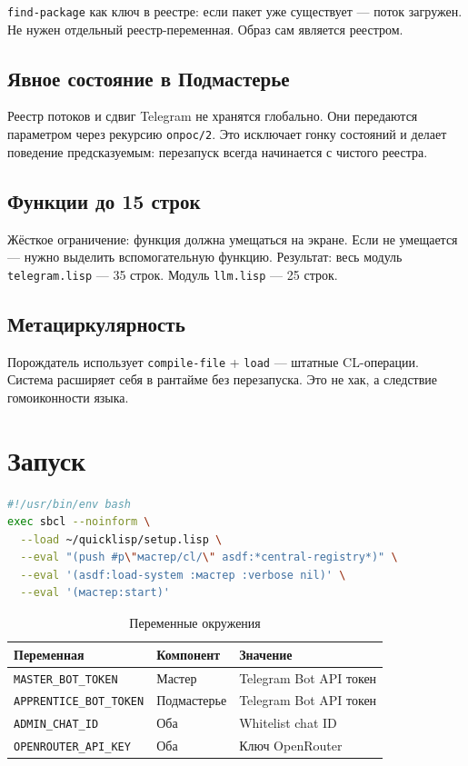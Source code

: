 \documentclass[11pt,a4paper]{article}
\begin{document}
\texttt{find-package} как ключ в реестре: если пакет уже существует — поток загружен. Не нужен отдельный реестр-переменная. Образ сам является реестром.

\subsection{Явное состояние в Подмастерье}

Реестр потоков и сдвиг Telegram не хранятся глобально. Они передаются параметром через рекурсию \texttt{опрос/2}. Это исключает гонку состояний и делает поведение предсказуемым: перезапуск всегда начинается с чистого реестра.

\subsection{Функции до 15 строк}

Жёсткое ограничение: функция должна умещаться на экране. Если не умещается — нужно выделить вспомогательную функцию. Результат: весь модуль \texttt{telegram.lisp} — 35 строк. Модуль \texttt{llm.lisp} — 25 строк.

\subsection{Метациркулярность}

Порождатель использует \texttt{compile-file} + \texttt{load} — штатные CL-операции. Система расширяет себя в рантайме без перезапуска. Это не хак, а следствие гомоиконности языка.

\section{Запуск}

\begin{lstlisting}[language=bash,caption={start.sh}]
#!/usr/bin/env bash
exec sbcl --noinform \
  --load ~/quicklisp/setup.lisp \
  --eval "(push #p\"мастер/cl/\" asdf:*central-registry*)" \
  --eval '(asdf:load-system :мастер :verbose nil)' \
  --eval '(мастер:start)'
\end{lstlisting}

\begin{table}[H]\centering\small
\begin{tabular}{lll}
\toprule
\textbf{Переменная} & \textbf{Компонент} & \textbf{Значение} \\
\midrule
\texttt{MASTER\_BOT\_TOKEN}     & Мастер      & Telegram Bot API токен \\
\texttt{APPRENTICE\_BOT\_TOKEN} & Подмастерье & Telegram Bot API токен \\
\texttt{ADMIN\_CHAT\_ID}        & Оба         & Whitelist chat ID \\
\texttt{OPENROUTER\_API\_KEY}   & Оба         & Ключ OpenRouter \\
\bottomrule
\end{tabular}
\caption{Переменные окружения}
\end{table}
\end{document}
